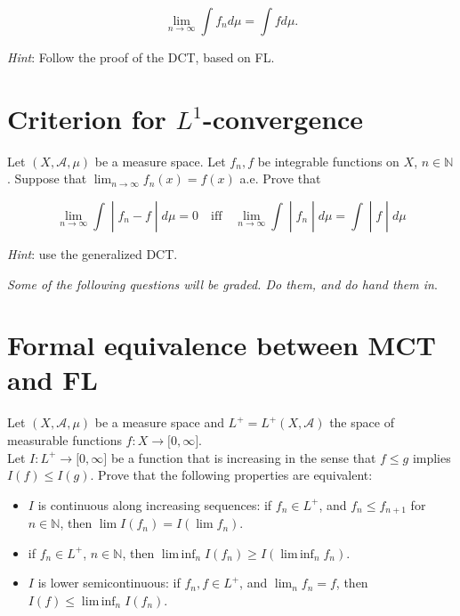 \documentclass{qlnotes-export}
\begin{document}
\[\lim\limits_{n\rightarrow\infty}\int f_{n} d\mu = \int f d\mu.\]

\emph{Hint}: Follow the proof of the DCT, based on FL.

\section{\texorpdfstring{Criterion for \(L^{1}\)-convergence}{Criterion for L\^{}\{1\}-convergence}}\label{criterion-for-l1-convergence}

Let \((X,\mathcal{A},\mu)\) be a measure space. Let \(f_{n},f\) be integrable functions on \(X\), \(n \in {\mathbb{N}}\). Suppose that \(\lim_{n\rightarrow\infty}f_{n}(x) = f(x)\) a.e. Prove that

\[\left. \lim\limits_{n\rightarrow\infty}\int \middle| f_{n} - f \middle| d\mu = 0\quad\text{iff}\quad\lim\limits_{n\rightarrow\infty}\int \middle| f_{n} \middle| d\mu = \int \middle| f \middle| d\mu \right.\]

\emph{Hint}: use the generalized DCT.

\emph{Some of the following questions will be graded. Do them, and do hand them in}.

\section{Formal equivalence between MCT and FL}\label{formal-equivalence-between-mct-and-fl}

Let \((X,\mathcal{A},\mu)\) be a measure space and \(L^{+} = L^{+}(X,\mathcal{A})\) the space of measurable functions \(f:X\rightarrow\lbrack 0,\infty\rbrack\).\\
Let \(I:L^{+}\rightarrow\lbrack 0,\infty\rbrack\) be a function that is increasing in the sense that \(f \leq g\) implies \(I(f) \leq I(g)\). Prove that the following properties are equivalent:

\begin{itemize}
\item
  \(I\) is continuous along increasing sequences: if \(f_{n} \in L^{+}\), and \(f_{n} \leq f_{n + 1}\) for \(n \in {\mathbb{N}}\), then \(\lim I(f_{n}) = I(\lim f_{n})\).
\item
  if \(f_{n} \in L^{+}\), \(n \in {\mathbb{N}}\), then \(\operatorname{lim\, inf}_{n}I(f_{n}) \geq I(\operatorname{lim\, inf}_{n}f_{n})\).
\item
  \(I\) is lower semicontinuous: if \(f_{n},f \in L^{+}\), and \(\lim_{n}f_{n} = f\), then \(I(f) \leq \operatorname{lim\, inf}_{n}I(f_{n})\).
\end{itemize}
\end{document}
